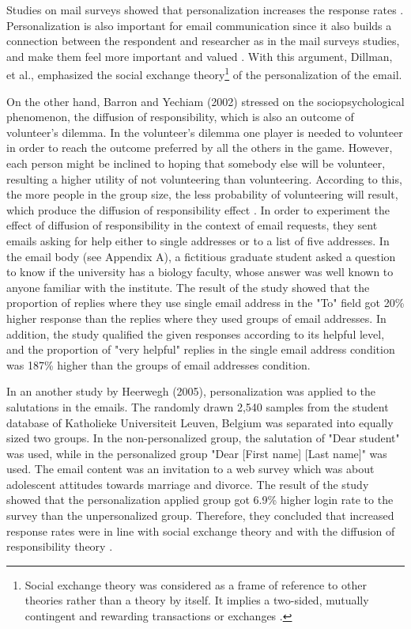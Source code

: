 Studies on mail surveys showed that personalization increases the response rates \citep{Dillman1991,Schaefer1998}. Personalization is also important for email communication since it also builds a connection between the respondent and researcher as in the mail surveys studies, and make them feel more important and valued \citep[page 272]{DillmanDonA.SmythJoleneD.Christian2009}. With this argument, Dillman, et al., emphasized the social exchange theory\footnote{Social exchange theory was considered as a frame of reference to other theories rather than a theory by itself. It implies a two-sided, mutually contingent and rewarding transactions or exchanges \citep{Emerson1976}.} of the personalization of the email.
\vspace{1cm}

On the other hand, Barron and Yechiam (2002) stressed on the sociopsychological phenomenon, the diffusion of responsibility, which is also an outcome of volunteer's dilemma. In the volunteer's dilemma one player is needed to volunteer in order to reach the outcome preferred by all the others in the game. However, each person might be inclined to hoping that somebody else will be volunteer, resulting a higher utility of not volunteering than volunteering. According to this, the more people in the group size, the less probability of volunteering will result, which produce the diffusion of responsibility effect \citep{Barron2002}. In order to experiment the effect of diffusion of responsibility in the context of email requests, they sent emails asking for help either to single addresses or to a list of five addresses. In the email body (see Appendix A), a fictitious graduate student asked a question to know if the university has a biology faculty, whose answer was well known to anyone familiar with the institute. The result of the study showed that the proportion of replies where they use single email address in the "To" field got 20\% higher response than the replies where they used groups of email addresses. In addition, the study qualified the given responses according to its helpful level, and the proportion of "very helpful" replies in the single email address condition was 187\% higher than the groups of email addresses condition.
\vspace{1cm}

In an another study by Heerwegh (2005), personalization was applied to the salutations in the emails. The randomly drawn 2,540 samples from the student database of Katholieke Universiteit Leuven, Belgium was separated into equally sized two groups. In the non-personalized group, the salutation of "Dear student" was used, while in the personalized group "Dear [First name] [Last name]" was used. The email content was an invitation to a web survey which was about adolescent attitudes towards marriage and divorce. The result of the study showed that the personalization applied group got 6.9\% higher login rate to the survey than the unpersonalized group. Therefore, they concluded that increased response rates were in line with social exchange theory and with the diffusion of responsibility theory \citep{Heerwegh2005}.
\vspace{1cm}


